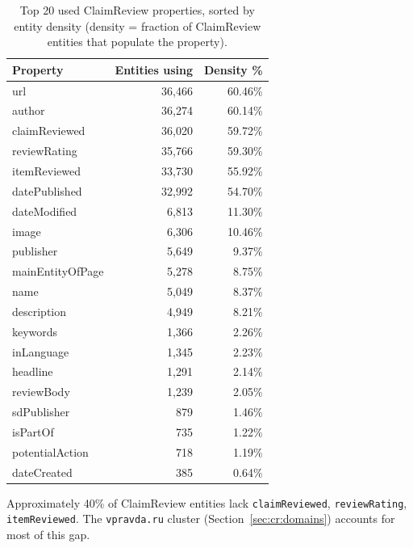 \documentclass[11pt,a4paper]{article}
\begin{document}
\begin{table}[H]
\centering
\caption{Top 20 used ClaimReview properties, sorted by entity density
  (density = fraction of ClaimReview entities that populate the property).}

\label{tab:cr_coverage}
\begin{tabular}{lrr}
\toprule
\textbf{Property} & \textbf{Entities using} & \textbf{Density \%} \\
\midrule
url                  & 36{,}466 & 60.46\% \\
author               & 36{,}274 & 60.14\% \\
claimReviewed        & 36{,}020 & 59.72\% \\
reviewRating         & 35{,}766 & 59.30\% \\
itemReviewed         & 33{,}730 & 55.92\% \\
datePublished        & 32{,}992 & 54.70\% \\
dateModified         &  6{,}813 & 11.30\% \\
image                &  6{,}306 & 10.46\% \\
publisher            &  5{,}649 &  9.37\% \\
mainEntityOfPage     &  5{,}278 &  8.75\% \\
name                 &  5{,}049 &  8.37\% \\
description          &  4{,}949 &  8.21\% \\
keywords             &  1{,}366 &  2.26\% \\
inLanguage           &  1{,}345 &  2.23\% \\
headline             &  1{,}291 &  2.14\% \\
reviewBody           &  1{,}239 &  2.05\% \\
sdPublisher          &    879   &  1.46\% \\
isPartOf             &    735   &  1.22\% \\
potentialAction      &    718   &  1.19\% \\
dateCreated          &    385   &  0.64\% \\
\bottomrule
\end{tabular}
\end{table}



Approximately 40\% of ClaimReview entities lack \texttt{claimReviewed}, \texttt{reviewRating}, \texttt{itemReviewed}.
The \texttt{vpravda.ru} cluster (Section~\ref{sec:cr:domains}) accounts for
most of this gap.
\end{document}
